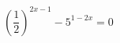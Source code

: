 \begin{ex}[type=equation]
	\begin{condition}
		$\left(\dfrac{1}{2}\right)^{2x - 1} - 5^{1 - 2x} = 0$
	\end{condition}
\end{ex}